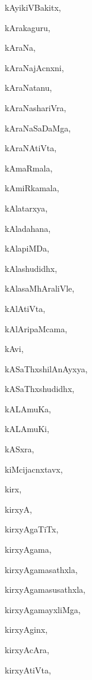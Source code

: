 \begin{multicols}{2}
{kAyikiVBakitx}, \pageref{kAyikiVBakitx}

{kArakaguru}, \pageref{kArakaguru}

{kAraNa}, \pageref{kAraNa}

{kAraNajAcnxni}, \pageref{kAraNajAcnxni}

{kAraNatanu}, \pageref{kAraNatanu}

{kAraNashariVra}, \pageref{kAraNashariVra}

{kAraNaSaDaMga}, \pageref{kAraNaSaDaMga}

{kAraNAtiVta}, \pageref{kAraNAtiVta}

{kAmaRmala}, \pageref{kAmaRmala}

{kAmiRkamala}, \pageref{kAmiRkamala}

{kAlatarxya}, \pageref{kAlatarxya}

{kAladahana}, \pageref{kAladahana}

{kAlapiMDa}, \pageref{kAlapiMDa}

{kAlashudidhx}, \pageref{kAlashudidhx}

{kAlasaMhAraliVle}, \pageref{kAlasaMhAraliVle}

{kAlAtiVta}, \pageref{kAlAtiVta}

{kAlAripaMcama}, \pageref{kAlAripaMcama}

{kAvi}, \pageref{kAvi}

{kASaThxshilAnAyxya}, \pageref{kASaThxshilAnAyxya}

{kASaThxshudidhx}, \pageref{kASaThxshudidhx}

{kALAmuKa}, \pageref{kALAmuKa}

{kALAmuKi}, \pageref{kALAmuKi}

{kASxra}, \pageref{kASxra}

{kiMcijacnxtavx}, \pageref{kiMcijacnxtavx}

{kirx}, \pageref{kirx}

{kirxyA}, \pageref{kirxyA}

{kirxyAgaTiTx}, \pageref{kirxyAgaTiTx}

{kirxyAgama}, \pageref{kirxyAgama}

{kirxyAgamasathxla}, \pageref{kirxyAgamasathxla}

{kirxyAgamasusathxla}, \pageref{kirxyAgamasusathxla}

{kirxyAgamayxliMga}, \pageref{kirxyAgamayxliMga}

{kirxyAginx}, \pageref{kirxyAginx}

{kirxyAcAra}, \pageref{kirxyAcAra}

{kirxyAtiVta}, \pageref{kirxyAtiVta}


\end{multicols}
